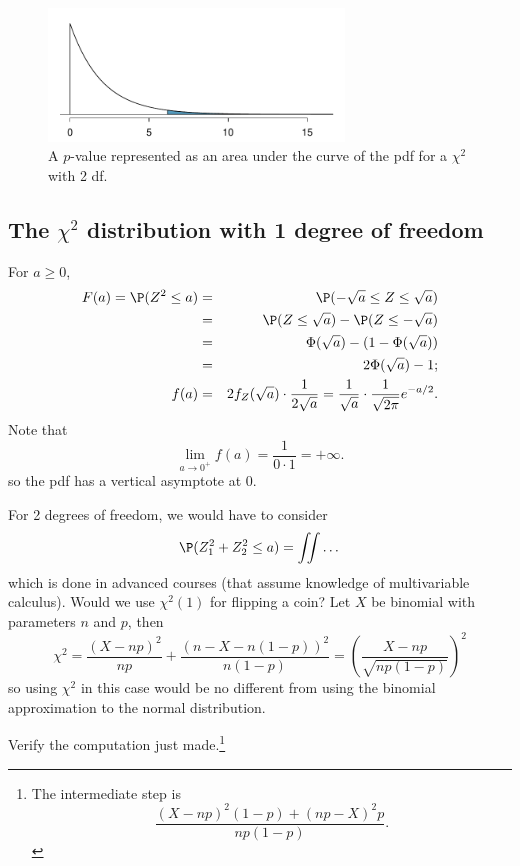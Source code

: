 \begin{figure}%
\centering
\includegraphics[width=0.7\textwidth]{ch_inference_for_props/figures/googleHTForDiffAlgPerformancePValue/googleHTForDiffAlgPerformancePValue}
\caption{A $p$-value represented as an area under the curve of the pdf for a $\chi^2$ with 2 df.}
\label{googleHTForDiffAlgPerformancePValue}
\end{figure}



\subsection{The $\chi^2$ distribution with 1 degree of freedom}

For $a\ge 0$,
\begin{eqnarray*}
	F(a) = \P(Z^2\le a) &=& \P(-\sqrt{a}\le Z\le\sqrt{a}) \\
	&=& \P(Z\le\sqrt{a})-\P(Z\le-\sqrt{a})\\
	&=& \Phi(\sqrt{a}) - (1-\Phi(\sqrt{a}))\\
	&=& 2\Phi(\sqrt{a})-1;\\
	f(a) &=& 2f_Z(\sqrt{a})\cdot \frac1{2\sqrt{a}} = \frac1{\sqrt{a}}\cdot\frac1{\sqrt{2\pi}} e^{-a/2}.
\end{eqnarray*}
Note that
\[
	\lim_{a\to 0^+} f(a) = \frac1{0\cdot 1}=+\infty.
\]
so the pdf has a vertical asymptote at $0$.

For 2 degrees of freedom, we would have to consider
\[
	\P(Z_1^2+Z_2^2\le a)=\iint\dots
\]
which is done in advanced courses (that assume knowledge of multivariable calculus).
Would we use $\chi^2(1)$ for flipping a coin?
Let $X$ be binomial with parameters $n$ and $p$, then
\[
	\chi^2 = \frac{(X-np)^2}{np} + \frac{(n-X-n(1-p))^2}{n(1-p)} = \left(\frac{X-np}{\sqrt{np(1-p)}}\right)^2
\]
so using $\chi^2$ in this case would be no different from using the binomial approximation to the normal distribution.
\begin{exercise}
Verify the computation just made.\footnote{The intermediate step is
\[
	\frac{(X-np)^2(1-p)+(np-X)^2p}{np(1-p)}.
\]}
\end{exercise}